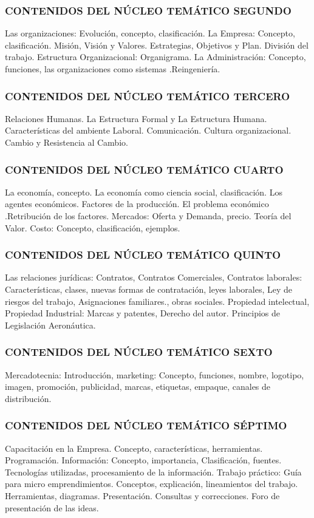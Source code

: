 \subsubsection*{CONTENIDOS DEL NÚCLEO TEMÁTICO SEGUNDO}
Las organizaciones: Evolución, concepto, clasificación. La Empresa: Concepto, clasificación. Misión, Visión y Valores. Estrategias, Objetivos y Plan. División del trabajo. Estructura Organizacional: Organigrama. La Administración: Concepto, funciones, las organizaciones como sistemas .Reingeniería.

\subsubsection*{CONTENIDOS DEL NÚCLEO TEMÁTICO TERCERO}
Relaciones Humanas. La Estructura Formal y La Estructura Humana. Características del ambiente Laboral. Comunicación. Cultura organizacional. Cambio y Resistencia al Cambio.

\subsubsection*{CONTENIDOS DEL NÚCLEO TEMÁTICO CUARTO}
La economía, concepto. La economía como ciencia social, clasificación. Los agentes económicos. Factores de la producción. El problema económico .Retribución de los factores. Mercados: Oferta y Demanda, precio. Teoría del Valor. Costo: Concepto, clasificación, ejemplos.

\subsubsection*{CONTENIDOS DEL NÚCLEO TEMÁTICO QUINTO}
Las relaciones jurídicas: Contratos, Contratos Comerciales, Contratos laborales: Características, clases, nuevas formas de contratación, leyes laborales, Ley de riesgos del trabajo, Asignaciones familiares., obras sociales. Propiedad intelectual, Propiedad Industrial: Marcas y patentes, Derecho del autor. Principios de Legislación Aeronáutica.

\subsubsection*{CONTENIDOS DEL NÚCLEO TEMÁTICO SEXTO}
Mercadotecnia: Introducción, marketing: Concepto, funciones, nombre, logotipo, imagen, promoción, publicidad, marcas, etiquetas, empaque, canales de distribución.

\subsubsection*{CONTENIDOS DEL NÚCLEO TEMÁTICO SÉPTIMO}
Capacitación en la Empresa. Concepto, características, herramientas. Programación. Información: Concepto, importancia, Clasificación, fuentes. Tecnologías utilizadas, procesamiento de la información. Trabajo práctico: Guía para micro emprendimientos. Conceptos, explicación, lineamientos del trabajo. Herramientas, diagramas. Presentación. Consultas y correcciones. Foro de presentación de las ideas.

